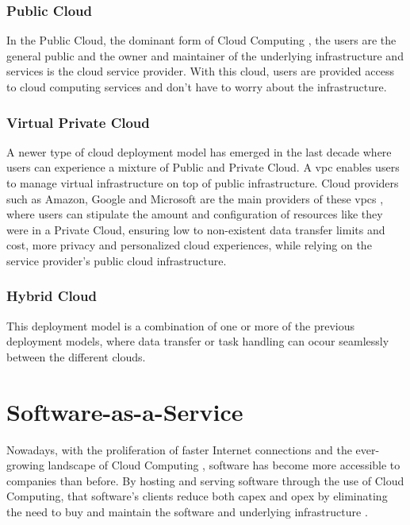 \subsubsection{Public Cloud}\label{state-of-the-art:sss:public-cloud}
In the Public Cloud, the dominant form of Cloud Computing \Parencite{dillon_tharam_and_wu_chen_and_chang_elizabeth}, the users are the general public and the owner and maintainer of the underlying infrastructure and services is the cloud service provider. With this cloud, users are provided access to cloud computing services and don't have to worry about the infrastructure.

\subsubsection{Virtual Private Cloud}\label{state-of-the-art:sss:virtual-private-cloud}
A newer type of cloud deployment model has emerged in the last decade where users can experience a mixture of Public and Private Cloud. A \gls{vpc} enables users to manage virtual infrastructure on top of public infrastructure. Cloud providers such as Amazon, Google and Microsoft are the main providers of these \gls{vpc}s \Parencite{aljamal_el-mousa_jubair_2018}, where users can stipulate the amount and configuration of resources like they were in a Private Cloud, ensuring low to non-existent data transfer limits and cost, more privacy and personalized cloud experiences, while relying on the service provider's public cloud infrastructure.

\subsubsection{Hybrid Cloud}\label{state-of-the-art:sss:hybrid-cloud} 
This deployment model is a combination of one or more of the previous deployment models, where data transfer or task handling can ocour seamlessly between the different clouds.

\section{Software-as-a-Service}\label{state-of-the-art:s:software-as-a-service}

Nowadays, with the proliferation of faster Internet connections and the ever-growing landscape of Cloud Computing
\Parencite{dillon_tharam_and_wu_chen_and_chang_elizabeth}, software has become more accessible to companies than before.
By hosting and serving software through the use of Cloud Computing, that software's clients reduce both \gls{capex} and \gls{opex} by eliminating the need to buy and maintain the software and underlying infrastructure \Parencite{alnumay_2020}.

